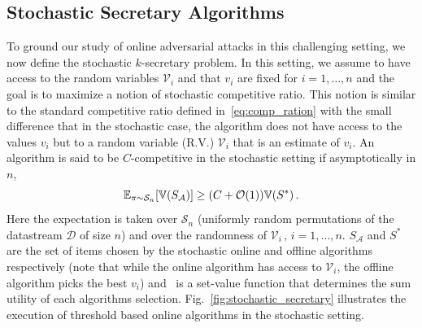 \subsection{Stochastic Secretary Algorithms}
\label{stochastic_secretary_algorithms_section}
To ground our study of online adversarial attacks in this challenging setting, we now define the stochastic $k$-secretary problem. In this setting, we assume to have access to the random variables $\mathcal{V}_i$ and that $v_i$ are fixed for $i = 1, \ldots,n$ and the goal is to maximize a notion of stochastic competitive ratio. This notion is similar to the standard competitive ratio defined in~\eqref{eq:comp_ration} with the small difference that in the stochastic case, the algorithm does not have access to the values $v_i$ but to a random variable (R.V.) $\mathcal{V}_i$ that is an estimate of $v_i$. An algorithm is said to be $C$-competitive in the stochastic setting if asymptotically in $n$,
\begin{equation*}
    \mathbb{E}_{\pi \sim \mathcal{S}_n}[\mathbb{V}(S_{\mathcal{A}})] \geq ( C + \mathcal{O}(1)) \mathbb{V}(S^*) \,.
    \label{eq:sto_comp_ration}
\end{equation*}
Here the expectation is taken over $\mathcal{S}_n$ (uniformly random permutations of the datastream $\mathcal{D}$ of size $n$) and over the randomness of $\mathcal{V}_i\,,\,i=1,\ldots,n$. $S_{\mathcal{A}}$ and $S^*$ are the set of items chosen by the stochastic online and offline algorithms respectively (note that while the online algorithm has access to $\mathcal{V}_i$, the offline algorithm picks the best $v_i$) and \setvalue\ is a set-value function that determines the sum utility of each algorithms selection. Fig.~\ref{fig:stochastic_secretary} illustrates the execution of threshold based online algorithms in the stochastic setting.





